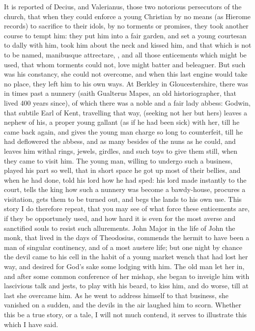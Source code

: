 {It is reported of Decius, and Valerianus, those two notorious
persecutors of the church, that when they could enforce a young
Christian by no means (as Hierome records) to sacrifice to their
idols, by no torments or promises, they took another course to tempt
him: they put him into a fair garden, and set a young courtesan to
dally with him, took him about the neck and kissed him, and that
which is not to be named, manibusque attrectare, \etc{}, and all those
enticements which might be used, that whom torments could not, love
might batter and beleaguer. But such was his constancy, she could not
overcome, and when this last engine would take no place, they left him
to his own ways. At Berkley in Gloucestershire, there was in
times past a nunnery (saith Gualterus Mapes, an old historiographer,
that lived 400 years since), of which there was a noble and a fair lady
abbess: Godwin, that subtile Earl of Kent, travelling that way,
(seeking not her but hers) leaves a nephew of his, a proper young
gallant (as if he had been sick) with her, till he came back again, and
gives the young man charge so long to counterfeit, till he had
deflowered the abbess, and as many besides of the nuns as he could, and
leaves him withal rings, jewels, girdles, and such toys to give them
still, when they came to visit him. The young man, willing to undergo
such a business, played his part so well, that in short space he got up
most of their bellies, and when he had done, told his lord how he had
sped: his lord made instantly to the court, tells the king how
such a nunnery was become a bawdy-house, procures a visitation, gets
them to be turned out, and begs the lands to his own use. This story I
do therefore repeat, that you may see of what force these enticements
are, if they be opportunely used, and how hard it is even for the most
averse and sanctified souls to resist such allurements. John Major in
the life of John the monk, that lived in the days of Theodosius,
commends the hermit to have been a man of singular continency, and of a
most austere life; but one night by chance the devil came to his cell
in the habit of a young market wench that had lost her way, and desired
for God's sake some lodging with him. The old man let her in, and
after some common conference of her mishap, she began to inveigle him
with lascivious talk and jests, to play with his beard, to kiss him,
and do worse, till at last she overcame him. As he went to address
himself to that business, she vanished on a sudden, and the devils in
the air laughed him to scorn. Whether this be a true story, or a tale,
I will not much contend, it serves to illustrate this which I have
said.

}
